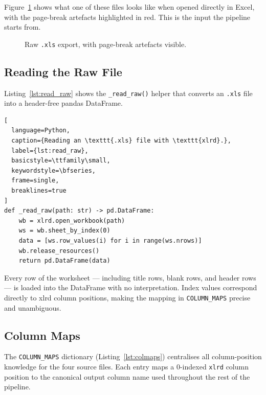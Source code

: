 Figure~\ref{fig:raw_xls} shows what one of these files looks like when
opened directly in Excel, with the page-break artefacts highlighted in
red. This is the input the pipeline starts from.

\begin{figure}[H]
  \centering
  \caption{Raw \texttt{.xls} export, with page-break artefacts visible.}
  \label{fig:raw_xls}
\end{figure}

\subsection{Reading the Raw File}

Listing~\ref{lst:read_raw} shows the \texttt{\_read\_raw()} helper that converts
an \texttt{.xls} file into a header-free pandas DataFrame.

\begin{lstlisting}[
  language=Python,
  caption={Reading an \texttt{.xls} file with \texttt{xlrd}.},
  label={lst:read_raw},
  basicstyle=\ttfamily\small,
  keywordstyle=\bfseries,
  frame=single,
  breaklines=true
]
def _read_raw(path: str) -> pd.DataFrame:
    wb = xlrd.open_workbook(path)
    ws = wb.sheet_by_index(0)
    data = [ws.row_values(i) for i in range(ws.nrows)]
    wb.release_resources()
    return pd.DataFrame(data)
\end{lstlisting}

Every row of the worksheet — including title rows, blank rows, and header rows —
is loaded into the DataFrame with no interpretation. Index values correspond
directly to xlrd column positions, making the mapping in \texttt{COLUMN\_MAPS}
precise and unambiguous.

\subsection{Column Maps}

The \texttt{COLUMN\_MAPS} dictionary (Listing~\ref{lst:colmaps}) centralises all
column-position knowledge for the four source files. Each entry maps a
0-indexed \texttt{xlrd} column position to the canonical output column name used
throughout the rest of the pipeline.

